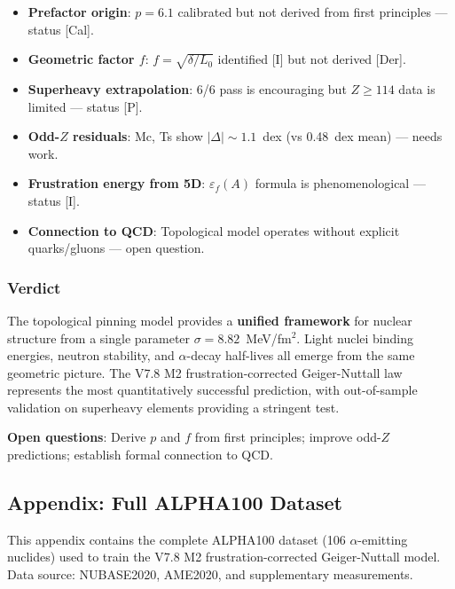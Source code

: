 \begin{itemize}
    \item \textbf{Prefactor origin}: $p = 6.1$ calibrated but not derived from first principles --- status [Cal].
    \item \textbf{Geometric factor $f$}: $f = \sqrt{\delta/L_0}$ identified [I] but not derived [Der].
    \item \textbf{Superheavy extrapolation}: 6/6 pass is encouraging but $Z \geq 114$ data is limited --- status [P].
    \item \textbf{Odd-$Z$ residuals}: Mc, Ts show $|\Delta| \sim 1.1$~dex (vs 0.48~dex mean) --- needs work.
    \item \textbf{Frustration energy from 5D}: $\varepsilon_f(A)$ formula is phenomenological --- status [I].
    \item \textbf{Connection to QCD}: Topological model operates without explicit quarks/gluons --- open question.
\end{itemize}

\subsubsection{Verdict}

The topological pinning model provides a \textbf{unified framework} for nuclear structure from a single parameter $\sigma = 8.82$~MeV/fm$^2$. Light nuclei binding energies, neutron stability, and $\alpha$-decay half-lives all emerge from the same geometric picture. The V7.8 M2 frustration-corrected Geiger-Nuttall law represents the most quantitatively successful prediction, with out-of-sample validation on superheavy elements providing a stringent test.

\textbf{Open questions}: Derive $p$ and $f$ from first principles; improve odd-$Z$ predictions; establish formal connection to QCD.

\subsection{Appendix: Full ALPHA100 Dataset}
\label{subsec:alpha100-appendix}

This appendix contains the complete ALPHA100 dataset (106 $\alpha$-emitting nuclides) used to train the V7.8 M2 frustration-corrected Geiger-Nuttall model. Data source: NUBASE2020, AME2020, and supplementary measurements.

